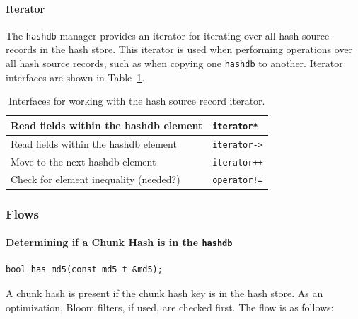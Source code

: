 \documentclass[10pt,twoside]{article}
\newcommand{\hdb}{\texttt{hashdb}\xspace}
\begin{document}
\paragraph{Iterator}
The \hdb manager provides an iterator for iterating over all hash source records in the hash store.
This iterator is used when performing operations over all hash source records,
such as when copying one \hdb to another.
Iterator interfaces are shown in Table~\ref{hashdb-manager-iterator-interfaces}.
\begin{table}[h]
\center
\begin{tabular}{|p{2in}|p{4in}|}
\hline
Read fields within the hashdb element & \texttt{iterator*} \\
\hline
Read fields within the hashdb element & \texttt{iterator->} \\
\hline
Move to the next hashdb element & \texttt{iterator++} \\
\hline
Check for element inequality (needed?) & \texttt{operator!=} \\
\hline
\end{tabular}
\caption{Interfaces for working with the hash source record iterator.\label{hashdb-manager-iterator-interfaces}}
\end{table}

\subsubsection{Flows}
\paragraph{Determining if a Chunk Hash is in the \hdb}
\begin{small}
\begin{verbatim}
bool has_md5(const md5_t &md5);
\end{verbatim}
\end{small}
A chunk hash is present if the chunk hash key is in the hash store.
As an optimization, Bloom filters, if used, are checked first.
The flow is as follows:

\begin{algorithmic}
  \RETURN \FALSE
\ENDIF
{}
  \RETURN \FALSE
\ENDIF
{}
  \RETURN \TRUE
\ELSE
  \RETURN \FALSE
\ENDIF
\end{algorithmic}
\end{document}
